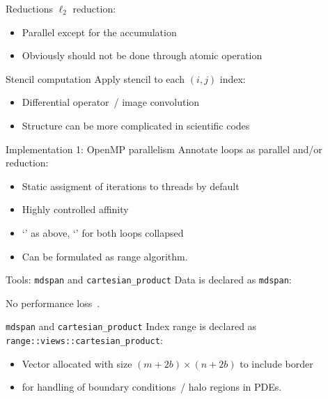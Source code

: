 \documentclass[10pt]{beamer}
\begin{document}
\begin{numberedframe}{Reductions}
  $\ell_2$ reduction:%
  \begin{itemize}
  \item Parallel except for the accumulation
  \item Obviously should not be done through atomic operation
  \end{itemize}
\end{numberedframe}

\begin{numberedframe}{Stencil computation}
  Apply stencil to each $(i,j)$ index:
  \begin{itemize}
  \item Differential operator~/ image convolution
  \item Structure can be more complicated in scientific codes
  \end{itemize}
\end{numberedframe}


\begin{numberedframe}{Implementation 1: OpenMP parallelism}
  Annotate loops as parallel and/or reduction:
  \begin{itemize}
  \item Static assigment of iterations to threads by default
  \item Highly controlled affinity
  \item `' as above, `' for both loops collapsed
  \item Can be formulated as range algorithm.
  \end{itemize}
\end{numberedframe}

\begin{numberedframe}{Tools: \texttt{mdspan} and \texttt{cartesian\_product}}
  Data is declared as \lstinline{mdspan}:
  \begin{multicols}{2}
  \columnbreak
  \end{multicols}

  No performance loss~\cite{Hollman:mdspan}.
\end{numberedframe}

\begin{numberedframe}{\texttt{mdspan} and \texttt{cartesian\_product}}
  Index range is declared as \lstinline{range::views::cartesian_product}:
  \begin{itemize}
  \item Vector allocated with size $(m+2b)\times(n+2b)$ to include border
  \item for handling of boundary conditions~/ halo regions in PDEs.
  \end{itemize}
\end{numberedframe}
\end{document}
